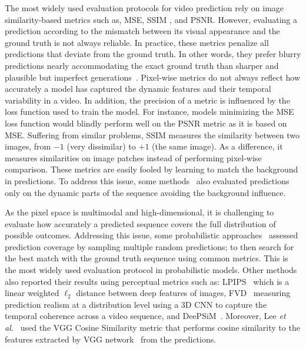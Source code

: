 The most widely used evaluation protocols for video prediction rely on image similarity-based metrics such as, \acf{MSE}, \ac{SSIM} \cite{Wang2004}, and \ac{PSNR}. However, evaluating a prediction according to the mismatch between its visual appearance and the ground truth is not always reliable. In practice, these metrics penalize all predictions that deviate from the ground truth. In other words, they prefer blurry predictions nearly accommodating the exact ground truth than sharper and plausible but imperfect generations~\cite{Zhang2018a,Lee2018,Castrejon2019}. Pixel-wise metrics do not always reflect how accurately a model has captured the dynamic features and their temporal variability in a video. In addition, the precision of a metric is influenced by the loss function used to train the model. For instance, models minimizing the \ac{MSE} loss function would blindly perform well on the \ac{PSNR} metric as it is based on \ac{MSE}. Suffering from similar problems, \ac{SSIM} measures the similarity between two images, from $-1$ (very dissimilar) to $+1$ (the same image). As a difference, it measures similarities on image patches instead of performing pixel-wise comparison. These metrics are easily fooled by learning to match the background in predictions. To address this issue, some methods~\cite{Mathieu2016,Luc2017,Terwilliger2019,Saric2020} also evaluated predictions only on the dynamic parts of the sequence avoiding the background influence.

As the pixel space is multimodal and high-dimensional, it is challenging to evaluate how accurately a predicted sequence covers the full distribution of possible outcomes. Addressing this issue, some probabilistic approaches~\cite{Castrejon2019,Denton2018,Lee2018} assessed prediction coverage by sampling multiple random predictions; to then search for the best match with the ground truth sequence using common metrics. This is the most widely used evaluation protocol in probabilistic models. Other methods~\cite{Castrejon2019,Jin2020,Shouno2020} also reported their results using perceptual metrics such as: \ac{LPIPS}~\cite{Zhang2018a} which is a linear weighted $\ell_2$ distance between deep features of images, \ac{FVD}~\cite{Unterthiner2018} measuring prediction realism at a distribution level using a 3D \ac{CNN} to capture the temporal coherence across a video sequence, and DeePSiM~\cite{Dosovitskiy2016}. Moreover, Lee \textit{et al.}~\cite{Lee2018} used the VGG Cosine Similarity metric that performs cosine similarity to the features extracted by VGG network~\cite{Simonyan2015} from the predictions.

